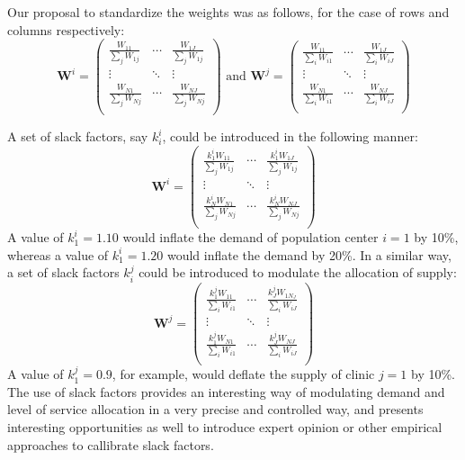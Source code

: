 \documentclass[10pt,letterpaper]{article}
\begin{document}
Our proposal to standardize the weights was as follows, for the case of
rows and columns respectively: \[
\mathbf{W}^{i} = \left(\begin{array}{ccc}
            \frac{W_{11}}{\sum_jW_{1j}} & \cdots & \frac{W_{1J}}{\sum_jW_{1j}}\\
            \vdots & \ddots & \vdots\\
            \frac{W_{N1}}{\sum_jW_{Nj}} & \cdots & \frac{W_{NJ}}{\sum_jW_{Nj}}\\
        \end{array}
        \right)
\text{  and  }
\mathbf{W}^{j} = \left(\begin{array}{ccc}
            \frac{W_{11}}{\sum_iW_{i1}} & \cdots & \frac{W_{1J}}{\sum_iW_{iJ}}\\
            \vdots & \ddots & \vdots\\
            \frac{W_{N1}}{\sum_iW_{i1}} & \cdots & \frac{W_{NJ}}{\sum_iW_{iJ}}\\
        \end{array}
        \right)
\]

A set of slack factors, say \(k^i_i\), could be introduced in the
following manner: \[
\mathbf{W}^{i} = \left(\begin{array}{ccc}
            \frac{k^i_1W_{11}}{\sum_jW_{1j}} & \cdots & \frac{k^i_1W_{1J}}{\sum_jW_{1j}}\\
            \vdots & \ddots & \vdots\\
            \frac{k^i_NW_{N1}}{\sum_jW_{Nj}} & \cdots & \frac{k^i_NW_{NJ}}{\sum_jW_{Nj}}\\
        \end{array}
        \right)
\] A value of \(k^i_1=1.10\) would inflate the demand of population
center \(i=1\) by 10\%, whereas a value of \(k^i_1 = 1.20\) would
inflate the demand by 20\%. In a similar way, a set of slack factors
\(k^j_i\) could be introduced to modulate the allocation of supply: \[
\mathbf{W}^{j} = \left(\begin{array}{ccc}
            \frac{k^j_1W_{11}}{\sum_iW_{i1}} & \cdots & \frac{k^j_{J}W_{1N_J}}{\sum_iW_{iJ}}\\
            \vdots & \ddots & \vdots\\
            \frac{k^j_{1}W_{N1}}{\sum_iW_{i1}} & \cdots & \frac{k^j_JW_{NJ}}{\sum_iW_{iJ}}\\
        \end{array}
        \right)
\] A value of \(k^j_1=0.9\), for example, would deflate the supply of
clinic \(j=1\) by 10\%. The use of slack factors provides an interesting
way of modulating demand and level of service allocation in a very
precise and controlled way, and presents interesting opportunities as
well to introduce expert opinion or other empirical approaches to
callibrate slack factors.
\end{document}
